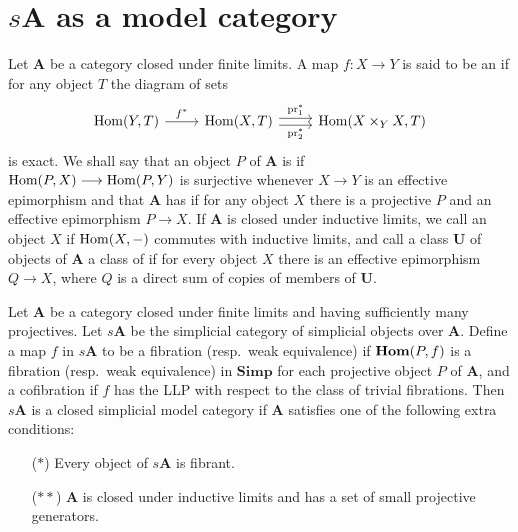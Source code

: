 \documentclass[../main]{subfiles}
\begin{document}
\section{\texorpdfstring{$s\mathbf{A}$}{sA} as a model category}\label{sec:2.4}

Let $\mathbf{A}$ be a category closed under finite limits. A map $f \colon X \longrightarrow Y$ is said to be an  if for any object $T$ the diagram of sets 
\[
\begin{tikzcd}
    {\Hom(Y, T)}
    \arrow[r, "f^*"]
    &
    {\Hom(X, T)}
    \arrow[r, "\pr^*_1", shift left]
    \arrow[r, "\pr^*_2"', shift right]
    &
    {\Hom(X \times_Y X, T)}
\end{tikzcd}
\]
is exact. We shall say that an object $P$ of $\mathbf{A}$ is  if \\$\operatorname{Hom}(P, X) \longrightarrow \operatorname{Hom}(P, Y)$ is surjective whenever $X \longrightarrow Y$ is an effective epimorphism and that $\mathbf{A}$ has  if for any object $X$ there is a projective $P$ and an effective epimorphism $P \longrightarrow X$. If $\mathbf{A}$ is closed under inductive limits, we call an object $X$  if $\operatorname{Hom}(X, -)$ commutes with  inductive limits, and call a class $\mathbf{U}$ of objects of $\mathbf{A}$ a class of  if for every object $X$ there is an effective epimorphism $Q \longrightarrow X$, where $Q$ is a direct sum of copies of members of $\mathbf{U}$. 

\begin{theorem}
\label{thm:2.4}
Let $\mathbf{A}$ be a category closed under finite limits and having sufficiently many projectives. Let $s\mathbf{A}$ be the simplicial category of simplicial objects over $\mathbf{A}$. Define a map $f$ in $s\mathbf{A}$ to be a fibration (resp.\ weak equivalence) if $\operatorname{\mathbf{Hom}}(P, f)$ is a fibration (resp.\ weak equivalence) in $\mathbf{Simp}$ for each projective object $P$ of $\mathbf{A}$, and a cofibration if $f$ has the LLP with respect to the class of trivial fibrations. Then $s\mathbf{A}$ is a closed simplicial model category if $\mathbf{A}$ satisfies one of the following extra conditions:
\begin{enumerate}
    \item[($\ast$)] 
    Every object of $s\mathbf{A}$ is fibrant. 
    
    \item[($\ast\ast$)] 
    $\mathbf{A}$ is closed under inductive limits and has a set of small projective generators.
\end{enumerate}
\end{theorem}
\end{document}
